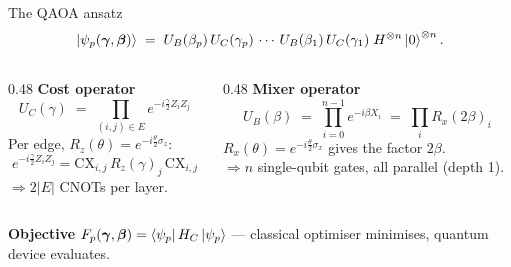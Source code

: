 \documentclass[aspectratio=169,10pt]{beamer}
\newcommand{\HC}{H_{C}}
\newcommand{\UC}{U_{C}(\gamma)}
\newcommand{\UB}{U_{B}(\beta)}
\begin{document}
\begin{frame}{The QAOA ansatz}
  \[
    \ket{\psi_p(\boldsymbol{\gamma},\boldsymbol{\beta})}
      \;=\;
      U_B(\beta_p)\,U_C(\gamma_p)\,\cdots\,U_B(\beta_1)\,U_C(\gamma_1)\;
      H^{\otimes n}\ket{0}^{\otimes n}.
  \]
  \begin{columns}[T,onlytextwidth]
    \begin{column}{0.48\textwidth}
      \small\textbf{Cost operator}
      \[
        \UC \;=\; \prod_{(i,j)\in E} e^{-i\frac{\gamma}{2} Z_i Z_j}
      \]
      Per edge, $R_z(\theta)=e^{-i\frac{\theta}{2}\sigma_z}$:
      \[
        e^{-i\frac{\gamma}{2}Z_iZ_j} =
        \text{CX}_{i,j}\,R_z(\gamma)_j\,\text{CX}_{i,j}
      \]
      $\Rightarrow 2|E|$ CNOTs per layer.
    \end{column}
    \begin{column}{0.48\textwidth}
      \small\textbf{Mixer operator}
      \[
        \UB \;=\; \prod_{i=0}^{n-1} e^{-i\beta X_i}
            \;=\; \prod_{i} R_x(2\beta)_i
      \]
      $R_x(\theta)=e^{-i\frac{\theta}{2}\sigma_x}$ gives the factor
      $2\beta$.\\[0.2em]
      $\Rightarrow n$ single-qubit gates, all parallel (depth 1).
    \end{column}
  \end{columns}
  \vspace{0.3em}
  \small\textbf{Objective}\quad
  $F_p(\boldsymbol\gamma,\boldsymbol\beta) = \bra{\psi_p}\HC\ket{\psi_p}$
  — classical optimiser minimises, quantum device evaluates.
\end{frame}
\end{document}

